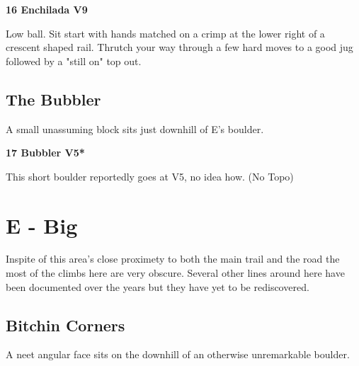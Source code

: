 \begin{multicols}{2}
					\begin{minipage}{\linewidth}	
					\label{rt:Enchilada}
\colorbox{Goldenrod!50}{
\parbox{0.95\textwidth}{
\textbf{
16 Enchilada V9    
}
}
}

					\begin{adjustwidth}{0.5cm}{}				
					Low ball. Sit start with hands matched on a crimp at the lower right of a crescent shaped rail. Thrutch your way through a few hard moves to a good jug followed by a "still on" top out.
					\end{adjustwidth}
					\end{minipage}
			\begin{minipage}{\columnwidth}
			\subsection*{The Bubbler}\label{bf:The Bubbler}
			A small unassuming block sits just downhill of E's boulder.
			
			\end{minipage}
			
					\begin{minipage}{\linewidth}	
					\label{rt:Bubbler}
\colorbox{RoyalBlue!20}{
\parbox{0.95\textwidth}{
\textbf{
17 Bubbler V5*  
}
}
}

					\begin{adjustwidth}{0.5cm}{}				
					This short boulder reportedly goes at V5, no idea how.
						\newline (No Topo) 
					\end{adjustwidth}
					\end{minipage}
\newpage

		\section{E - Big}\label{sa:Big}
	\begin{minipage}{\columnwidth}
	Inspite of this area's close proximety to both the main trail and the road the most of the climbs here are very obscure. Several other lines around here have been documented over the years but they have yet to be rediscovered.
	\end{minipage}
	
			\begin{minipage}{\columnwidth}
			\subsection*{Bitchin Corners}\label{bf:Bitchin Corners}
			A neet angular face sits on the downhill of an otherwise unremarkable boulder.
			

\end{minipage}
\end{multicols}
